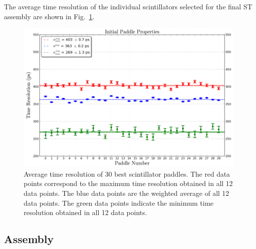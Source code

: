 The average time resolution of the individual scintillators selected for the final ST assembly are shown in Fig.~\ref{fig:final_30_tr_wrapped}.
	\begin{figure}[!htb]
		\centering
		\includegraphics[width=1.0\columnwidth]{fabrication//figs/final_30_tr_wrapped}
		\caption{Average time resolution of 30 best scintillator paddles.  The red data points correspond to the maximum time resolution obtained in all 12 data points. The blue data points are the weighted average of all 12 data points.  The green data points indicate the minimum time resolution obtained in all 12 data points.}
		\label{fig:final_30_tr_wrapped}
	\end{figure}

\subsection{Assembly} \label{sec:fab_ass}

